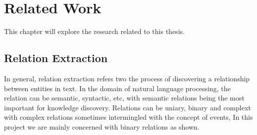 \chapter{Related Work}  %

\ifpdf
    \graphicspath{{Background/Figs/Raster/}{Background/Figs/PDF/}{Background/Figs/}}
\else
    \graphicspath{{Background/Figs/Vector/}{Background/Figs/}}
\fi

This chapter will explore the research related to this thesis. 

\section{Relation Extraction} %
In general, relation extraction refers two the process of discovering a relationship between entities in text. In the domain of natural language processing, the relation can be semantic, syntactic, etc, with semantic relations being the most important for knowledge discovery. Relations can be uniary, binary and complext with complex relations sometimes intermingled with the concept of events, In this project we are mainly concerned with binary relations as shown.

